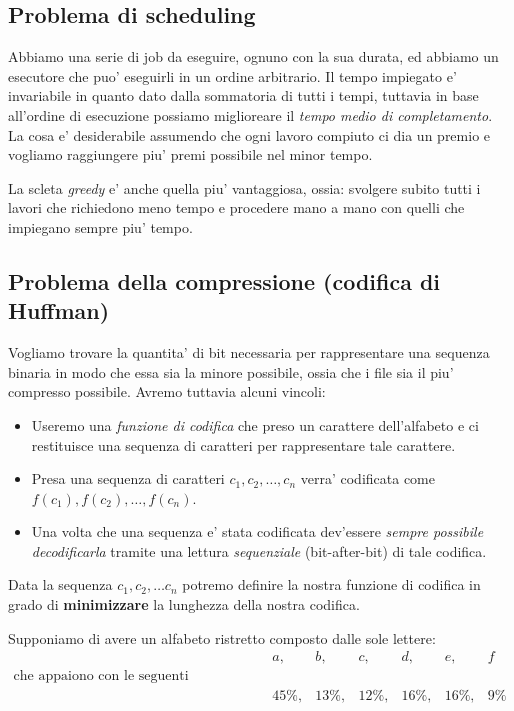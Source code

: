 \documentclass{article}
\begin{document}
\subsection{Problema di scheduling}

Abbiamo una serie di job da eseguire, ognuno con la sua durata, ed abbiamo un
esecutore che puo' eseguirli in un ordine arbitrario. Il tempo impiegato e' invariabile
in quanto dato dalla sommatoria di tutti i tempi, tuttavia in base all'ordine di
esecuzione possiamo miglioreare il \emph{tempo medio di completamento}. La cosa
e' desiderabile assumendo che ogni lavoro compiuto ci dia un premio e vogliamo
raggiungere piu' premi possibile nel minor tempo.

La scleta \emph{greedy} e' anche quella piu' vantaggiosa, ossia: svolgere subito
tutti i lavori che richiedono meno tempo e procedere mano a mano con quelli che impiegano sempre piu' tempo.

\subsection{Problema della compressione (codifica di Huffman)}

Vogliamo trovare la quantita' di bit necessaria per rappresentare una
sequenza binaria in modo che essa sia la minore possibile, ossia che i file sia
il piu' compresso possibile. Avremo tuttavia alcuni vincoli:

\begin{itemize}
  \item Useremo una \emph{funzione di codifica} che preso un carattere
    dell'alfabeto e ci restituisce una sequenza di caratteri per rappresentare
    tale carattere.
  \item Presa una sequenza di caratteri $c_1, c_2, \ldots, c_n$ verra' codificata
    come $f(c_1), f(c_2), \ldots, f(c_n)$.
  \item Una volta che una sequenza e' stata codificata dev'essere \emph{sempre
    possibile decodificarla} tramite una lettura \emph{sequenziale} (bit-after-bit)
    di tale codifica.
\end{itemize}

Data la sequenza $c_1, c_2, \ldots c_n$ potremo definire la nostra funzione di
codifica in grado di \textbf{minimizzare} la lunghezza della nostra codifica.

Supponiamo di avere un alfabeto ristretto composto dalle sole lettere:
\begin{align*}
  &a, &b, &c, &d, &e, &f \\
  \text{che appaiono con le seguenti probabilita':} \\
  &45\%, &13\%, &12\%, &16\%, &16\%, &9\%
\end{align*}
\end{document}

